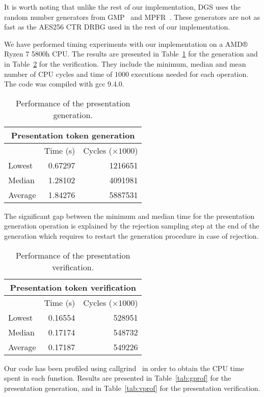 It is worth noting that unlike the rest of our implementation, DGS uses the random number generators from GMP~\cite{gmp} and MPFR~\cite{mpfr}. These generators are not as fast as the AES256 CTR DRBG used in the rest of our implementation.

We have performed timing experiments with our implementation on a AMD® Ryzen 7 5800h CPU. The results are presented in Table~\ref{tab:gperf} for the generation and in Table~\ref{tab:vperf} for the verification. They include the minimum, median and mean number of CPU cycles and time of 1000 executions needed for each operation. The code was compiled with gcc 9.4.0.

\begin{table}[!ht]
\centering
\caption{Performance of the presentation generation.}
\label{tab:gperf}
\begin{tabular}{lrr}
\toprule
\multicolumn{3}{c}{\textbf{Presentation token generation}} \\
\midrule
 & Time (s) & Cycles ($\times 1000$) \\
\midrule
Lowest  & 0.67297  & 1216651  \\
Median  & 1.28102  & 4091981  \\
Average & 1.84276  & 5887531  \\
\bottomrule
\end{tabular}
\end{table}

The significant gap between the minimum and median time for the presentation generation operation is explained by the rejection sampling step at the end of the generation which requires to restart the generation procedure in case of rejection.

\begin{table}[!ht]
\centering
\caption{Performance of the presentation verification.}
\label{tab:vperf}
\begin{tabular}{lrr}
\toprule
\multicolumn{3}{c}{\textbf{Presentation token verification}} \\
\midrule
 & Time (s) & Cycles ($\times 1000$) \\
\midrule
Lowest  & 0.16554  & 528951  \\
Median  & 0.17174  & 548732  \\
Average & 0.17187  & 549226  \\
\bottomrule
\end{tabular}
\end{table}

Our code has been profiled using callgrind~\cite{callgrind} in order to obtain the CPU time spent in each funstion. Results are presented in Table~\ref{tab:gprof} for the presentation generation, and in Table~\ref{tab:vprof} for the presentation verification.

